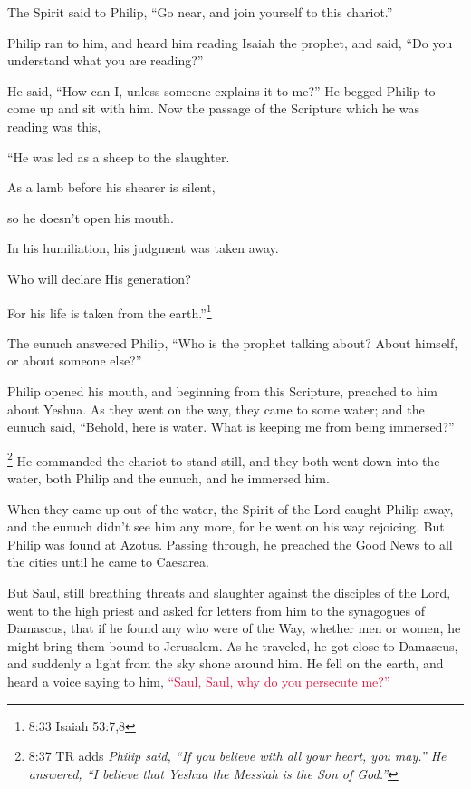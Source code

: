 \myverse{}The Spirit said to Philip, “Go near, and join yourself to this
chariot.”

\myverse{}Philip ran to him, and heard him reading Isaiah the prophet,
and said, “Do you understand what you are reading?”

\myverse{}He said, “How can I, unless someone explains it to me?” He begged
Philip to come up and sit with him.
\myverse{}Now the passage of the Scripture which he was reading was this,

“He was led as a sheep to the slaughter.

As a lamb before his shearer is silent,

so he doesn’t open his mouth.

\myverse{}In his humiliation, his judgment was taken away.

Who will declare His generation?

For his life is taken from the earth.”\footnote{8:33 Isaiah 53:7,8}

\myverse{}The eunuch answered Philip, “Who is the prophet talking about?
About himself, or about someone else?”

\myverse{}Philip opened his mouth, and beginning from this Scripture, preached
to him about Yeshua.
\myverse{}As they went on the way, they came to some water; and the eunuch said, “Behold,
here is water. What is keeping me from being immersed?”

\myverse{}\footnote{8:37 TR adds \textit{Philip said, “If you believe with all your heart, you may.” He answered, “I believe that Yeshua the Messiah is the Son of God.”}}
\myverse{}He commanded the chariot to stand still, and they both went down into the
water, both Philip and the eunuch, and he immersed him.

\myverse{}When they came up out of the water, the Spirit of the Lord caught
Philip away, and the eunuch didn’t see him any more, for he went on his way rejoicing.
\myverse{}But Philip was found at Azotus. Passing through, he preached the Good News
to all the cities until he came to Caesarea.


\mychapter{} \myverse*{}But Saul, still breathing threats and slaughter against the disciples
of the Lord, went to the high priest
\myverse{}and asked for letters from him to the synagogues of Damascus, that if he found
any who were of the Way, whether men or women, he might bring them bound to Jerusalem.
\myverse{}As he traveled, he got close to Damascus, and suddenly a light from the sky
shone around him.
\myverse{}He fell on the earth, and heard a voice saying to him,
\textcolor{crimson}{“Saul, Saul, why do you persecute me?”}

